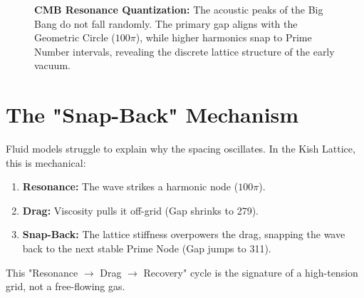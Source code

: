 \documentclass[11pt, letterpaper, openany]{book}
\begin{document}
\begin{figure}[h]
\centering
{}
\caption{\textbf{CMB Resonance Quantization:} The acoustic peaks of the Big Bang do not fall randomly. The primary gap aligns with the Geometric Circle ($100\pi$), while higher harmonics snap to Prime Number intervals, revealing the discrete lattice structure of the early vacuum.}
\label{fig:cmb_resonance}
\end{figure}

\section{The "Snap-Back" Mechanism}
Fluid models struggle to explain why the spacing oscillates. In the Kish Lattice, this is mechanical:
\begin{enumerate}
    \item \textbf{Resonance:} The wave strikes a harmonic node ($100\pi$).
    \item \textbf{Drag:} Viscosity pulls it off-grid (Gap shrinks to 279).
    \item \textbf{Snap-Back:} The lattice stiffness overpowers the drag, snapping the wave back to the next stable Prime Node (Gap jumps to 311).
\end{enumerate}
This "Resonance $\to$ Drag $\to$ Recovery" cycle is the signature of a high-tension grid, not a free-flowing gas.
\end{document}
